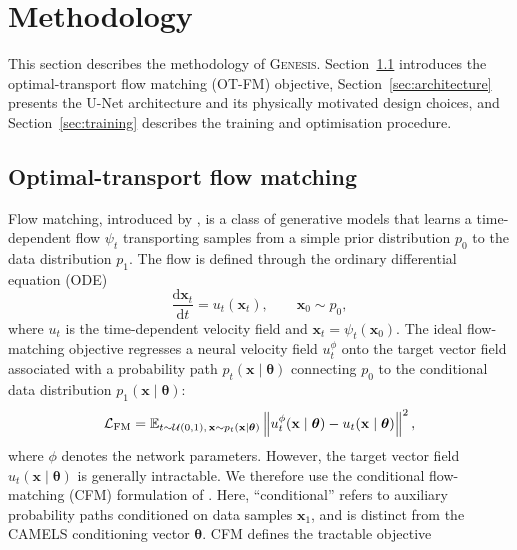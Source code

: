 \documentclass[usenatbib]{mnras}
\newcommand{\thetavec}{\boldsymbol{\theta}}
\begin{document}
\section{Methodology}
\label{sec:methods}
This section describes the methodology of \textsc{Genesis}.
Section~\ref{sec:flow_matching} introduces the optimal-transport flow
matching (OT-FM) objective, Section~\ref{sec:architecture} presents
the U-Net architecture and its physically motivated design choices,
and Section~\ref{sec:training} describes the training and optimisation
procedure.

\subsection{Optimal-transport flow matching}
\label{sec:flow_matching}
Flow matching, introduced by \citet{Lipman2023}, is a class of
generative models that learns a time-dependent flow $\psi_t$
transporting samples from a simple prior distribution $p_0$ to the
data distribution $p_1$. The flow is defined through the ordinary
differential equation (ODE)
\begin{equation}
  \frac{\mathrm{d}\mathbf{x}_t}{\mathrm{d}t}
  =
  u_t(\mathbf{x}_t),
  \qquad
  \mathbf{x}_0\sim p_0,
  \label{eq:flow_ode}
\end{equation}
where $u_t$ is the time-dependent velocity field and
$\mathbf{x}_t=\psi_t(\mathbf{x}_0)$.
The ideal flow-matching objective regresses a neural velocity field
$u_t^\phi$ onto the target vector field associated with a probability
path $p_t(\mathbf{x}\mid\thetavec)$ connecting $p_0$ to the conditional
data distribution $p_1(\mathbf{x}\mid\thetavec)$:
\begin{equation}
  \mathcal{L}_{\rm FM} =
  \mathbb{E}_{t\sim\mathcal{U}(0,1),\,
  \mathbf{x}\sim p_t(\mathbf{x}\mid\thetavec)}
  \left\|
    u_t^\phi(\mathbf{x}\mid\thetavec)
    -
    u_t(\mathbf{x}\mid\thetavec)
  \right\|^2 ,
  \label{eq:fm}
\end{equation}
where $\phi$ denotes the network parameters. However, the target vector
field $u_t(\mathbf{x}\mid\thetavec)$ is generally intractable. We
therefore use the conditional flow-matching (CFM) formulation of
\citet{Lipman2023}. Here, ``conditional'' refers to auxiliary
probability paths conditioned on data samples $\mathbf{x}_1$, and is
distinct from the CAMELS conditioning vector $\thetavec$. CFM defines
the tractable objective
\end{document}
